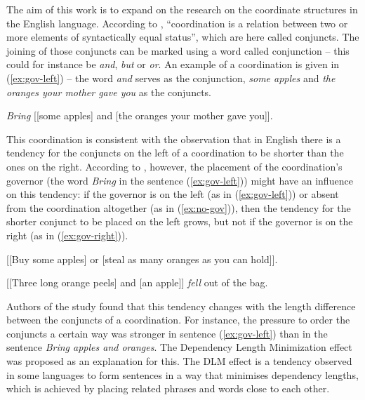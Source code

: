 The aim of this work is to expand on the research on the coordinate structures in the English language. According to \citet[p. 66]{Huddleston-Pullum-2002}, ``coordination is a relation between two or more elements of syntactically equal status'', which are here called conjuncts. The joining of those conjuncts can be marked using a word called conjunction -- this could for instance be \textsl{and}, \textsl{but} or \textsl{or}. An example of a coordination is given in (\ref{ex:gov-left}) -- the word \textsl{and} serves as the conjunction, \textsl{some apples} and \textsl{the oranges your mother gave you} as the conjuncts.

\begin{exe}
    \ex\label{ex:gov-left}
    \textsl{Bring} [[some apples] and [the oranges your mother gave you]].
\end{exe}

This coordination is consistent with the observation that in English there is a tendency for the conjuncts on the left of a coordination to be shorter than the ones on the right. According to \cite{prz:woz:23}, however, the placement of the coordination's governor (the word \textsl{Bring} in the sentence (\ref{ex:gov-left})) might have an influence on this tendency: if the governor is on the left (as in (\ref{ex:gov-left})) or absent from the coordination altogether (as in (\ref{ex:no-gov})), then the tendency for the shorter conjunct to be placed on the left grows, but not if the governor is on the right (as in (\ref{ex:gov-right})).

\begin{exe}
    \ex\label{ex:no-gov}
    [[Buy some apples] or [steal as many oranges as you can hold]].
\end{exe}

\begin{exe}
    \ex\label{ex:gov-right}
    [[Three long orange peels] and [an apple]] \textsl{fell} out of the bag.
\end{exe}

Authors of the study found that this tendency changes with the length difference between the conjuncts of a coordination. For instance, the pressure to order the conjuncts a certain way was stronger in sentence (\ref{ex:gov-left}) than in the sentence \textsl{Bring apples and oranges}. The Dependency Length Minimization effect was proposed as an explanation for this. The DLM effect is a tendency observed in some languages to form sentences in a way that minimises dependency lengths, which is achieved by placing related phrases and words close to each other. 

